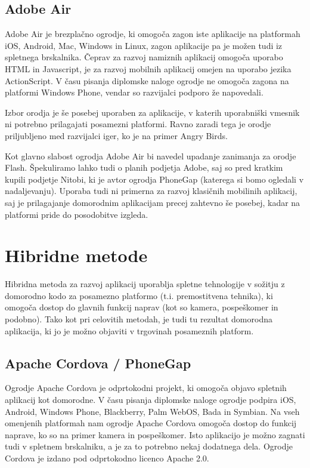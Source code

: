 \subsection{Adobe Air}

Adobe Air\cite{adobeair} je brezplačno ogrodje, ki omogoča zagon iste aplikacije na platformah iOS, Android, Mac, Windows in Linux, zagon aplikacije pa je možen tudi iz spletnega brskalnika. Čeprav za razvoj namiznih aplikacij omogoča uporabo HTML in Javascript, je za razvoj mobilnih aplikacij omejen na uporabo jezika ActionScript. V času pisanja diplomske naloge ogrodje ne omogoča zagona na platformi Windows Phone, vendar so razvijalci podporo že napovedali.

Izbor orodja je še posebej uporaben za aplikacije, v katerih uporabniški vmesnik ni potrebno prilagajati posamezni platformi. Ravno zaradi tega je orodje priljubljeno med razvijalci iger, ko je na primer Angry Birds\cite{angrybirds}.

Kot glavno slabost ogrodja Adobe Air bi navedel upadanje zanimanja za orodje Flash. Špekuliramo lahko tudi o planih podjetja Adobe, saj so pred kratkim kupili podjetje Nitobi, ki je avtor ogrodja PhoneGap (katerega si bomo ogledali v nadaljevanju). Uporaba tudi ni primerna za razvoj klasičnih mobilinih aplikacij, saj je prilagajanje domorodnim aplikacijam precej zahtevno še posebej, kadar na platformi pride do posodobitve izgleda.

\section{Hibridne metode}

Hibridna metoda za razvoj aplikacij uporablja spletne tehnologije v sožitju z domorodno kodo za posamezno platformo (t.i. premostitvena tehnika), ki omogoča dostop do glavnih funkcij naprav (kot so kamera, pospeškomer in podobno). Tako kot pri celovitih metodah, je tudi tu rezultat domorodna aplikacija, ki jo je možno objaviti v trgovinah posameznih platform.

\subsection{Apache Cordova / PhoneGap}

Ogrodje Apache Cordova\cite{cordova} je odprtokodni projekt, ki omogoča objavo spletnih aplikacij kot domorodne\cite{web-vs-native}. V času pisanja diplomske naloge ogrodje podpira iOS, Android, Windows Phone, Blackberry, Palm WebOS, Bada in Symbian. Na vseh omenjenih platformah nam ogrodje Apache Cordova omogoča dostop do funkcij naprave, ko so na primer kamera in pospeškomer. Isto aplikacijo je možno zagnati tudi v spletnem brskalniku, a je za to potrebno nekaj dodatnega dela. Ogrodje Cordova je izdano pod odprtokodno licenco Apache 2.0\cite{apache-licence}.

